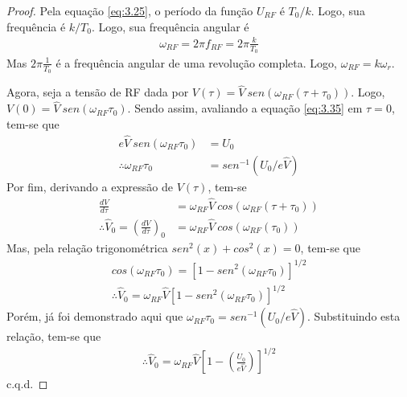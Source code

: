 \begin{proof}
	Pela equação \eqref{eq:3.25}, o período da função $U_{RF}$ é $T_0/k$. Logo, sua frequência é $k/T_0$. Logo, sua frequência angular é
	\begin{align*}
		\omega_{RF} = 2\pi f_{RF} = 2\pi \frac{k}{T_0}
	\end{align*}
	Mas $2\pi \frac{1}{T_0}$ é a frequência angular de uma revolução completa. Logo, $\omega_{RF} = k\omega_r$.
	
	Agora, seja a tensão de RF dada por $V(\tau) = \widehat{V}\ sen(\omega_{RF}(\tau+\tau_0))$. Logo, $V(0) = \widehat{V}\ sen(\omega_{RF}\tau_0)$. Sendo assim, avaliando a equação \eqref{eq:3.35} em $\tau=0$, tem-se que
	\begin{align*}
		e\widehat{V}\ sen(\omega_{RF}\tau_0) &= U_0\\
		\therefore \omega_{RF}\tau_0 &= sen^{-1}(U_0/e\widehat{V})
	\end{align*}
	Por fim, derivando a expressão de $V(\tau)$, tem-se
	\begin{align*}
		\frac{dV}{d\tau} &= \omega_{RF}\widehat{V}\ cos(\omega_{RF}(\tau+\tau_0))\\
		\therefore \widehat{V}_0 = \left(\frac{dV}{d\tau}\right)_0 &= \omega_{RF}\widehat{V}\ cos(\omega_{RF}(\tau_0))
	\end{align*}
	Mas, pela relação trigonométrica $sen^2(x) + cos^2(x) = 0$, tem-se que
	\begin{align*}
		cos(\omega_{RF}\tau_0) = [1-sen^2(\omega_{RF}\tau_0)]^{1/2}\\
		\therefore \widehat{V}_0 = \omega_{RF}\widehat{V}[1-sen^2(\omega_{RF}\tau_0)]^{1/2}
	\end{align*}
	Porém, já foi demonstrado aqui que $\omega_{RF}\tau_0 = sen^{-1}(U_0/e\widehat{V})$. Substituindo esta relação, tem-se que
	\begin{align*}
		\therefore \widehat{V}_0 = \omega_{RF}\widehat{V}\left[1-\left(\frac{U_0}{e\widehat{V}}\right)\right]^{1/2}
	\end{align*}
	c.q.d.
\end{proof}